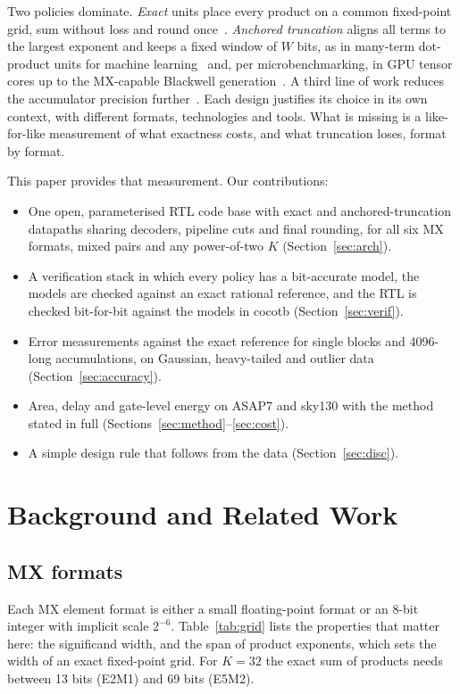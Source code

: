 \documentclass[conference,compsoc]{IEEEtran}
\begin{document}
Two policies dominate.  \emph{Exact} units place every product on a common
fixed-point grid, sum without loss and round once~\cite{lutz2024fp8,desrentes2023exact}.
\emph{Anchored truncation} aligns all terms to the largest exponent and keeps
a fixed window of $W$ bits, as in many-term dot-product units for machine
learning~\cite{kaul2019dot,hickmann2020nnpt} and, per microbenchmarking,
in GPU tensor cores up to the MX-capable Blackwell
generation~\cite{fasi2021tensor,khattak2025tensor,rout2025tenfour}.  A third line of
work reduces the accumulator precision further~\cite{cuyckens2025mx}.  Each
design justifies its choice in its own context, with different formats,
technologies and tools.  What is missing is a like-for-like measurement of
what exactness costs, and what truncation loses, format by format.

This paper provides that measurement.  Our contributions:
\begin{itemize}
  \item One open, parameterised RTL code base with exact and anchored-truncation
        datapaths sharing decoders, pipeline cuts and final rounding, for
        all six MX formats, mixed pairs and any power-of-two $K$
        (Section~\ref{sec:arch}).
  \item A verification stack in which every policy has a bit-accurate model,
        the models are checked against an exact rational reference, and the
        RTL is checked bit-for-bit against the models in cocotb
        (Section~\ref{sec:verif}).
  \item Error measurements against the exact reference for single blocks and
        4096-long accumulations, on Gaussian, heavy-tailed and outlier data
        (Section~\ref{sec:accuracy}).
  \item Area, delay and gate-level energy on ASAP7 and sky130 with the
        method stated in full (Sections~\ref{sec:method}--\ref{sec:cost}).
  \item A simple design rule that follows from the data (Section~\ref{sec:disc}).
\end{itemize}

\section{Background and Related Work}
\subsection{MX formats}
Each MX element format is either a small floating-point format or an
8-bit integer with implicit scale $2^{-6}$.  Table~\ref{tab:grid} lists the
properties that matter here: the significand width, and the span of product
exponents, which sets the width of an exact fixed-point grid.  For $K=32$
the exact sum of products needs between 13 bits (E2M1) and 69 bits (E5M2).
\end{document}
